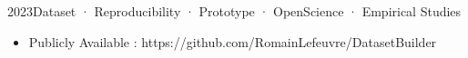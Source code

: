  {2023}{Dataset · Reproducibility · Prototype · OpenScience · Empirical Studies}{}
{\begin{itemize}
    \item Publicly Available : https://github.com/RomainLefeuvre/DatasetBuilder 
\end{itemize}
}